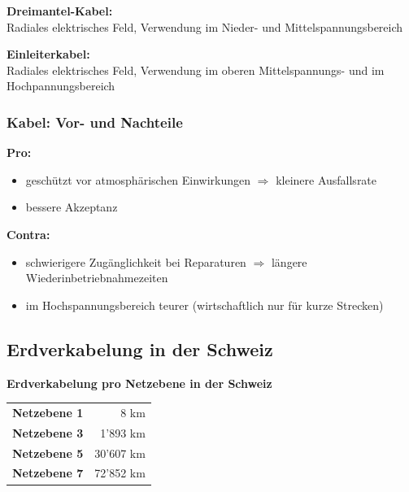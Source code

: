 \textbf{Dreimantel-Kabel:}\\
Radiales elektrisches Feld, Verwendung im Nieder- und Mittelspannungsbereich

\textbf{Einleiterkabel:}\\
Radiales elektrisches Feld, Verwendung im oberen Mittelspannungs- und im Hochpannungsbereich





\subsubsection{Kabel: Vor- und Nachteile}

\textbf{Pro:}
\begin{itemize}
    \item geschützt vor atmosphärischen Einwirkungen $\Rightarrow$ kleinere Ausfallsrate
    \item bessere Akzeptanz
\end{itemize}

\vspace{1em}
\textbf{Contra:}
\begin{itemize}
    \item schwierigere Zugänglichkeit bei Reparaturen $\Rightarrow$ längere Wiederinbetriebnahmezeiten
    \item im Hochspannungsbereich teurer (wirtschaftlich nur für kurze Strecken)
\end{itemize}


\subsection{Erdverkabelung in der Schweiz}

\textbf{Erdverkabelung pro Netzebene in der Schweiz}\\
\begin{tabular}{>{\bfseries}l r}
    Netzebene 1 & 8 km \\
    Netzebene 3 & 1'893 km \\
    Netzebene 5 & 30'607 km \\
    Netzebene 7 & 72'852 km \\
\end{tabular}



















